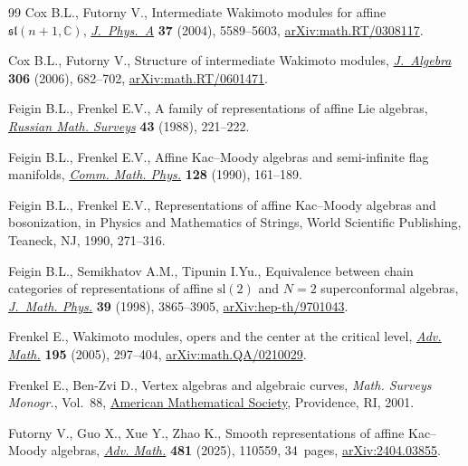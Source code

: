\documentclass[pdftex]{sigma}
\numberwithin{equation}{section}
\theoremstyle{definition}
\newcommand{\1}{\textbf{1}}
\begin{document}
\begin{thebibliography}{99}
Cox B.L., Futorny V., Intermediate {W}akimoto modules for affine
 {$\mathfrak{sl}(n+1,\mathbb{C})$},
 \href{https://doi.org/10.1088/0305-4470/37/21/006}{\textit{J.~Phys.~A}}
 \textbf{37} (2004), 5589--5603,
 \href{http://arxiv.org/abs/math.RT/0308117}{arXiv:math.RT/0308117}.

Cox B.L., Futorny V., Structure of intermediate {W}akimoto modules,
 \href{https://doi.org/10.1016/j.jalgebra.2006.08.019}{\textit{J.~Algebra}}
 \textbf{306} (2006), 682--702,
 \href{http://arxiv.org/abs/math.RT/0601471}{arXiv:math.RT/0601471}.

Feigin B.L., Frenkel E.V., A family of representations of affine {L}ie
 algebras,
 \href{https://doi.org/10.1070/RM1988v043n05ABEH001935}{\textit{Russian Math.
 Surveys}} \textbf{43} (1988), 221--222.

Feigin B.L., Frenkel E.V., Affine {K}ac--{M}oody algebras and semi-infinite
 flag manifolds, \href{https://doi.org/10.1007/BF02097051}{\textit{Comm. Math.
 Phys.}} \textbf{128} (1990), 161--189.

Feigin B.L., Frenkel E.V., Representations of affine {K}ac--{M}oody algebras
 and bosonization, in Physics and Mathematics of Strings, World Scientific
 Publishing, Teaneck, NJ, 1990, 271--316.

Feigin B.L., Semikhatov A.M., Tipunin I.Yu., Equivalence between chain
 categories of representations of affine {$\mathrm{sl}(2)$} and {$N=2$}
 superconformal algebras,
 \href{https://doi.org/10.1063/1.532473}{\textit{J.~Math. Phys.}} \textbf{39}
 (1998), 3865--3905,
 \href{http://arxiv.org/abs/hep-th/9701043}{arXiv:hep-th/9701043}.

Frenkel E., Wakimoto modules, opers and the center at the critical level,
 \href{https://doi.org/10.1016/j.aim.2004.08.002}{\textit{Adv. Math.}}
 \textbf{195} (2005), 297--404,
 \href{http://arxiv.org/abs/math.QA/0210029}{arXiv:math.QA/0210029}.

Frenkel E., Ben-Zvi D., Vertex algebras and algebraic curves, \textit{Math.
 Surveys Monogr.}, Vol.~88, \href{https://doi.org/10.1090/surv/088}{American
 Mathematical Society}, Providence, RI, 2001.

Futorny V., Guo X., Xue Y., Zhao K., Smooth representations of affine
 {K}ac--{M}oody algebras,
 \href{https://doi.org/10.1016/j.aim.2025.110559}{\textit{Adv. Math.}}
 \textbf{481} (2025), 110559, 34~pages,
 \href{http://arxiv.org/abs/2404.03855}{arXiv:2404.03855}.


\end{thebibliography}
\end{document}
